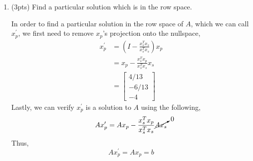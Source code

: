 \begin{enumerate}[label=(\alph*)]
    \item (3pts) Find a particular solution which is in the row space.
        \begin{mdframed}[style=MyFrame]
            In order to find a particular solution in the row space of $A$,
            which we can call $x_{p}^{\prime}$, we first need to remove
            $x_{p}$'s projection onto the nullspace,
            \begin{equation}
                \begin{aligned}
                    x_{p}^{\prime}  & =
                            \left(I - \frac{x_{s}^{T}x_{s}}{x_{s}^{T}x_{s}}\right)x_{p} \\
                                & = x_{p} - \frac{x_{s}^{T}x_{p}}{x_{s}^{T}x_{s}} x_{s} \\
                                & = 
                                \begin{bmatrix}
                                    4/13   \\
                                    -6/13   \\
                                    -4
                                \end{bmatrix}
                \end{aligned}
            \end{equation}
            Lastly, we can verify $x_{p}^{\prime}$ is a solution to $A$ using the following,
            \begin{equation}
                A x_{p}^{\prime} = A x_{p} -
                                    \frac{x_{s}^{T} x_{p}}{x_{s}^{T}x_{s}} 
                                    \cancelto{0}{A x_{s}}
            \end{equation}
            Thus,
            \begin{equation}
                Ax_{p}^{\prime} = A x_{p} = b
            \end{equation}
        \end{mdframed}
\end{enumerate}
